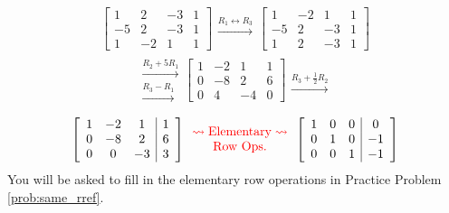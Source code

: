 \documentclass{ximera}
\begin{document}
\begin{exploration}
$$\left[\begin{array}{ccc|c} 
 1&2&-3&1\\-5&2&-3&1\\1&-2&1&1
 \end{array}\right]
 \begin{array}{c}
 \\
 \xrightarrow{R_1\leftrightarrow R_3}\\
\\
 \end{array}
\left[\begin{array}{ccc|c} 
 1&-2&1&1\\-5&2&-3&1\\1&2&-3&1
 \end{array}\right]$$
$$\begin{array}{c}
 \\
 \xrightarrow{R_2+5R_1}\\
 \xrightarrow{R_3-R_1}\\
 \end{array}
\left[\begin{array}{ccc|c} 
 1&-2&1&1\\0&-8&2&6\\0&4&-4&0
 \end{array}\right]
 \begin{array}{c}
 \\
 \\
 \xrightarrow{R_3+\frac{1}{2}R_2}\\
 \end{array}
$$
\begin{equation*}
  \left[\begin{array}{ccc|c} 
 1&-2&1&1\\0&-8&2&6\\0&0&-3&3
 \end{array}\right]
 \color{red}
 \begin{array}{c}
\rightsquigarrow\text{Elementary}\rightsquigarrow\\
\text{Row Ops.}
\end{array}
 \color{black}
  \left[\begin{array}{ccc|c} 
 1&0&0&0\\0&1&0&-1\\0&0&1&-1
 \end{array}\right]
\end{equation*}
You will be asked to fill in the elementary row operations in Practice Problem \ref{prob:same_rref}.
\end{exploration}
 
\end{document}
